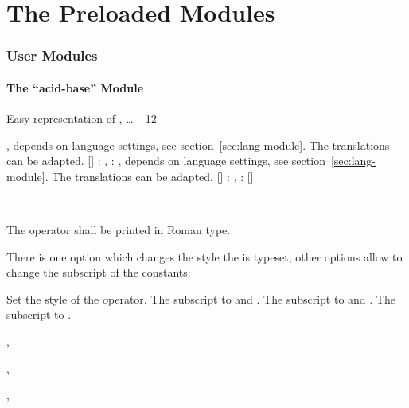 \documentclass[load-preamble+]{cnltx-doc}
\makeatletter
\def\chemmodule*#1{\textquotedblleft#1\textquotedblright}%
\renewenvironment{commands}
  {%
    \cnltx@set@catcode_{12}%
    \let\command\cnltx@command
    \cnltxlist
  }
  {\endcnltxlist}
\makeatother
\begin{document}
\part{The Preloaded Modules}\label{part:preloaded-modules}

\section{User Modules}
\subsection{The \chemmodule*{acid-base} Module}\label{sec:acid-base-module}

Easy representation of \pH, \pKa \ldots
\begin{commands}
  \command{pH} \pH
  \command{pOH} \pOH
  \command{Ka} \Ka, depends on language settings, see
    section~\vref{sec:lang-module}.  The translations can be adapted.
  \command{Kb} \Kb
  \command{Kw} \Kw
  \command{pKa}[] : \pKa, : \pKa[1], depends
    on language settings, see  section~\vref{sec:lang-module}.  The translations
    can be adapted.
  \command{pKb}[] : \pKb, : \pKb[1]
  \command{p}[] \eg\  \p{\Kw}
\end{commands}

\begin{example}
  \Ka\ \Kb\ \pKa\ \pKa[1] \pKb\ \pKb[1]
\end{example}

\begin{cnltxquote}
 The operator \p{} \textelp{} shall be printed in Roman type.
\end{cnltxquote}

There is one option which changes the style the \p{} is typeset, other options
allow to change the subscript of the constants:
\begin{options}
    Set the style of the \p{} operator.
    The subscript to  and .
    The subscript to  and .
    The subscript to .
\end{options}
\begin{example}
  \pH, \pKa \par
   \pH, \pKa \par
   \pH, \pKa
\end{example}
\end{document}
